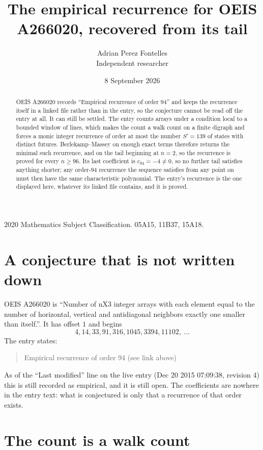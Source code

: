 \documentclass[11pt,a4paper]{article}
\title{The empirical recurrence for OEIS A266020, recovered from its tail}
\author{Adrian Perez Fontelles\\ \small Independent researcher}
\date{8 September 2026}
\theoremstyle{plain}
\theoremstyle{definition}
\begin{document}
\maketitle

\begin{abstract}
OEIS A266020 records ``Empirical recurrence of order $94$'' and keeps the recurrence itself in
a linked file rather than in the entry, so the conjecture cannot be read off the entry at all.
It can still be settled. The entry counts arrays under a condition local to a bounded window of
lines, which makes the count a walk count on a finite digraph and forces a monic integer
recurrence of order at most the number $S'=139$ of states with distinct futures. Berlekamp--Massey on
enough exact terms therefore returns the minimal such recurrence, and on the tail beginning at $n=2$, so the recurrence is proved for every $n\ge96$.
Its last coefficient is $c_{94}=-4\neq0$, so no further tail satisfies anything
shorter; any order-$94$ recurrence the sequence satisfies from any point on must then have
the same characteristic polynomial. The entry's recurrence is the one displayed here, whatever
its linked file contains, and it is proved.
\end{abstract}

\noindent\small 2020 Mathematics Subject Classification. 05A15, 11B37, 15A18.\normalsize

\section{A conjecture that is not written down}

OEIS A266020 is ``Number of nX3 integer arrays with each element equal to the number of horizontal, vertical and antidiagonal neighbors exactly one smaller than itself.''. It has offset $1$ and begins
\[
4, 14, 33, 91, 316, 1045, 3394, 11102,\ \dots
\]
The entry states:
\begin{quote}
Empirical recurrence of order 94 (see link above)
\end{quote}
As of the ``Last modified'' line on the live entry (Dec 20 2015 07:09:38, revision 4)
this is still recorded as empirical, and it is still open. The coefficients are nowhere in the
entry text: what is conjectured is only that a recurrence of that order exists.

\section{The count is a walk count}
\end{document}
